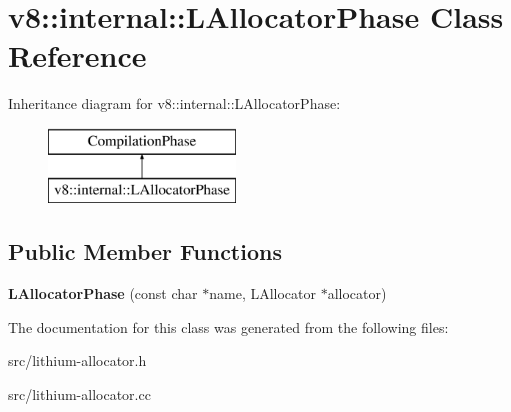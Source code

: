 \hypertarget{classv8_1_1internal_1_1_l_allocator_phase}{}\section{v8\+:\+:internal\+:\+:L\+Allocator\+Phase Class Reference}
\label{classv8_1_1internal_1_1_l_allocator_phase}
Inheritance diagram for v8\+:\+:internal\+:\+:L\+Allocator\+Phase\+:\begin{figure}[H]
\begin{center}
\leavevmode
\includegraphics[height=2.000000cm]{classv8_1_1internal_1_1_l_allocator_phase}
\end{center}
\end{figure}
\subsection*{Public Member Functions}
\begin{DoxyCompactItemize}
\item 
\hypertarget{classv8_1_1internal_1_1_l_allocator_phase_ab20de2aa106216356743f3ff26346e51}{}{\bfseries L\+Allocator\+Phase} (const char $\ast$name, L\+Allocator $\ast$allocator)\label{classv8_1_1internal_1_1_l_allocator_phase_ab20de2aa106216356743f3ff26346e51}

\end{DoxyCompactItemize}


The documentation for this class was generated from the following files\+:\begin{DoxyCompactItemize}
\item 
src/lithium-\/allocator.\+h\item 
src/lithium-\/allocator.\+cc\end{DoxyCompactItemize}
